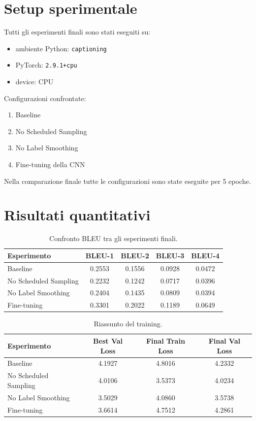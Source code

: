 \documentclass[11pt,a4paper]{article}
\begin{document}
\section{Setup sperimentale}

Tutti gli esperimenti finali sono stati eseguiti su:
\begin{itemize}[leftmargin=*]
    \item ambiente Python: \texttt{captioning}
    \item PyTorch: \texttt{2.9.1+cpu}
    \item device: CPU
\end{itemize}

Configurazioni confrontate:
\begin{enumerate}[leftmargin=*]
    \item Baseline
    \item No Scheduled Sampling
    \item No Label Smoothing
    \item Fine-tuning della CNN
\end{enumerate}

Nella comparazione finale tutte le configurazioni sono state eseguite per 5 epoche.

\section{Risultati quantitativi}

\begin{table}[H]
\centering
\caption{Confronto BLEU tra gli esperimenti finali.}
\begin{tabular}{lcccc}
\toprule
Esperimento & BLEU-1 & BLEU-2 & BLEU-3 & BLEU-4 \\
\midrule
Baseline & 0.2553 & 0.1556 & 0.0928 & 0.0472 \\
No Scheduled Sampling & 0.2232 & 0.1242 & 0.0717 & 0.0396 \\
No Label Smoothing & 0.2404 & 0.1435 & 0.0809 & 0.0394 \\
Fine-tuning & 0.3301 & 0.2022 & 0.1189 & 0.0649 \\
\bottomrule
\end{tabular}
\end{table}

\begin{table}[H]
\centering
\caption{Riassunto del training.}
\begin{tabular}{lccc}
\toprule
Esperimento & Best Val Loss & Final Train Loss & Final Val Loss \\
\midrule
Baseline & 4.1927 & 4.8016 & 4.2332 \\
No Scheduled Sampling & 4.0106 & 3.5373 & 4.0234 \\
No Label Smoothing & 3.5029 & 4.0860 & 3.5738 \\
Fine-tuning & 3.6614 & 4.7512 & 4.2861 \\
\bottomrule
\end{tabular}
\end{table}
\end{document}
